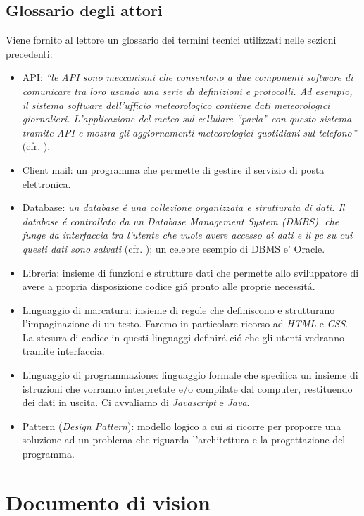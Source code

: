 \documentclass[12pt]{article}
\begin{document}
\subsection{Glossario degli attori}

Viene fornito al lettore un glossario dei termini tecnici utilizzati nelle sezioni precedenti:
\begin{itemize}
    \item API: \textit{``le API sono meccanismi che consentono a due componenti software di comunicare tra loro usando una serie di definizioni e protocolli. Ad esempio, il sistema software dell'ufficio meteorologico contiene dati meteorologici giornalieri. L'applicazione del meteo sul cellulare ``parla'' con questo sistema tramite API e mostra gli aggiornamenti meteorologici quotidiani sul telefono''} (cfr. \cite{bworld}).
    \item Client mail: un programma che permette di gestire il servizio di posta elettronica.
    \item Database: \textit{un database \'e una collezione organizzata e strutturata di dati. Il database \'e controllato da un Database Management System (DMBS), che funge da interfaccia tra l'utente che vuole avere accesso ai dati e il pc su cui questi dati sono salvati} (cfr. \cite{database}); un celebre esempio di DBMS e' Oracle. 
    \item Libreria: insieme di funzioni e strutture dati che permette allo sviluppatore di avere a propria disposizione codice gi\'a pronto alle proprie necessit\'a.
    \item Linguaggio di marcatura: insieme di regole che definiscono e strutturano l'impaginazione di un testo. Faremo in particolare ricorso ad \textit{HTML} e \textit{CSS}. La stesura di codice in questi linguaggi definir\'a ci\'o che gli utenti vedranno tramite interfaccia.
    \item Linguaggio di programmazione: linguaggio formale che specifica un insieme di istruzioni che vorranno interpretate e/o compilate dal computer, restituendo dei dati in uscita. Ci avvaliamo di \textit{Javascript} e \textit{Java}.
    \item Pattern (\textit{Design Pattern}): modello logico a cui si ricorre per proporre una soluzione ad un problema che riguarda l'architettura e la progettazione del programma. 
\end{itemize}


\section{Documento di vision}
\end{document}
